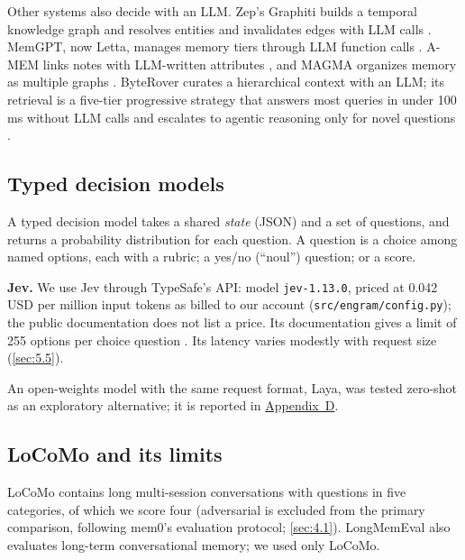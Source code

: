 \documentclass[11pt]{article}
\newcommand{\src}[1]{}
\begin{document}
Other systems also decide with an LLM. Zep's Graphiti builds a temporal knowledge graph and resolves entities and invalidates edges with LLM calls \citep{rasmussen2025zep}. MemGPT, now Letta, manages memory tiers through LLM function calls \citep{packer2023memgpt}. A-MEM links notes with LLM-written attributes \citep{xu2025amem}, and MAGMA organizes memory as multiple graphs \citep{jiang2026magma}. ByteRover curates a hierarchical context with an LLM; its retrieval is a five-tier progressive strategy that answers most queries in under 100\src{nguyen2026byterover (sub-100 ms tier resolution)} ms without LLM calls and escalates to agentic reasoning only for novel questions \citep{nguyen2026byterover}.

\subsection{Typed decision models}\label{sec:2.2}
A typed decision model takes a shared \emph{state} (JSON) and a set of questions, and returns a probability distribution for each question. A question is a choice among named options, each with a rubric; a yes/no (``noul'') question; or a score.

\textbf{Jev.} We use Jev through TypeSafe's API: model \texttt{jev-1.13.0}, priced at 0.042\src{src/engram/config.py (USD per million input tokens)} USD per million input tokens as billed to our account (\texttt{src/\allowbreak{}engram/\allowbreak{}config.py}); the public documentation does not list a price. Its documentation gives a limit of 255\src{typesafe2026jev (max options per Choice)} options per choice question \citep{typesafe2026jev}. Its latency varies modestly with request size (\cref{sec:5.5}).

An open-weights model with the same request format, Laya, was tested zero-shot as an exploratory alternative; it is reported in \hyperref[app:D]{Appendix~D}.

\subsection{LoCoMo and its limits}\label{sec:2.3}
LoCoMo \citep{maharana2024locomo} contains long multi-session conversations with questions in five categories, of which we score four (adversarial is excluded from the primary comparison, following mem0's evaluation protocol; \cref{sec:4.1}). LongMemEval \citep{wu2025longmemeval} also evaluates long-term conversational memory; we used only LoCoMo.
\end{document}
